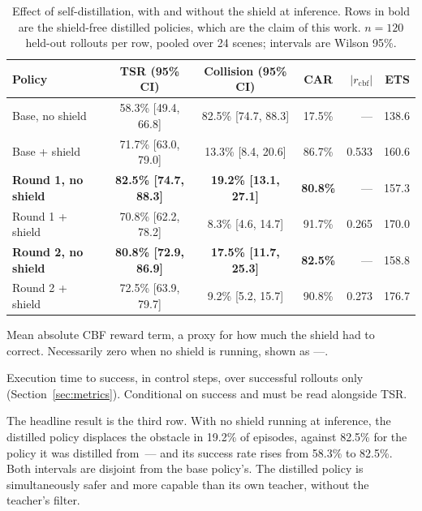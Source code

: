 \documentclass[a4paper,11pt]{report}
\begin{document}
\begin{table}[htbp]
\centering
\begin{threeparttable}
\caption[Effect of self-distillation on safety and task performance]{%
  Effect of self-distillation, with and without the shield at inference. Rows in bold are the
  shield-free distilled policies, which are the claim of this work. $n = 120$ held-out rollouts
  per row, pooled over 24 scenes; intervals are Wilson 95\%.}
\label{tab:internalisation}
\begin{tabular}{lcccrr}
\toprule
\textbf{Policy} & \textbf{TSR (95\% CI)} & \textbf{Collision (95\% CI)} & \textbf{CAR}
  & $\lvert r_{\mathrm{cbf}}\rvert$\tnote{a} & \textbf{ETS}\tnote{b} \\
\midrule
Base, no shield        & 58.3\% [49.4, 66.8] & 82.5\% [74.7, 88.3] & 17.5\% & ---   & 138.6 \\
Base + shield          & 71.7\% [63.0, 79.0] & 13.3\% [\phantom{0}8.4, 20.6] & 86.7\% & 0.533 & 160.6 \\
\addlinespace[3pt]
\textbf{Round 1, no shield} & \textbf{82.5\% [74.7, 88.3]} & \textbf{19.2\% [13.1, 27.1]}
  & \textbf{80.8\%} & --- & 157.3 \\
Round 1 + shield       & 70.8\% [62.2, 78.2] & \phantom{0}8.3\% [\phantom{0}4.6, 14.7] & 91.7\% & 0.265 & 170.0 \\
\addlinespace[3pt]
\textbf{Round 2, no shield} & \textbf{80.8\% [72.9, 86.9]} & \textbf{17.5\% [11.7, 25.3]}
  & \textbf{82.5\%} & --- & 158.8 \\
Round 2 + shield       & 72.5\% [63.9, 79.7] & \phantom{0}9.2\% [\phantom{0}5.2, 15.7] & 90.8\% & 0.273 & 176.7 \\
\bottomrule
\end{tabular}
\begin{tablenotes}[flushleft]\footnotesize
\item[a] Mean absolute CBF reward term, a proxy for how much the shield had to correct. Necessarily
  zero when no shield is running, shown as ---.
\item[b] Execution time to success, in control steps, over successful rollouts only
  (Section~\ref{sec:metrics}). Conditional on success and must be read alongside TSR.
\end{tablenotes}
\end{threeparttable}
\end{table}

The headline result is the third row. With no shield running at inference, the distilled policy
displaces the obstacle in 19.2\% of episodes, against 82.5\% for the policy it was distilled
from~--- and its success rate rises from 58.3\% to 82.5\%. Both intervals are disjoint from the
base policy's. The distilled policy is simultaneously safer and more capable than its own teacher,
without the teacher's filter.
\end{document}
